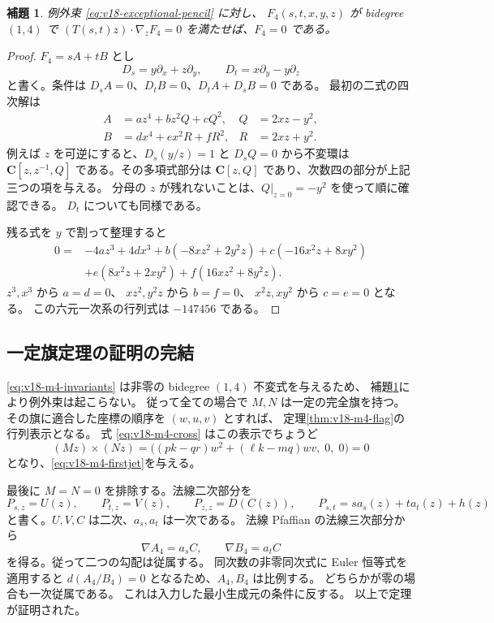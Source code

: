 \documentclass[11pt,a4paper]{ltjsarticle}
\newtheorem{lemma}[theorem]{補題}
\theoremstyle{remark}\newtheorem{remark}[theorem]{注意}
\begin{document}
\begin{lemma}\label{lem:v18-no-bidegree14}
例外束 \eqref{eq:v18-exceptional-pencil} に対し、
$F_4(s,t,x,y,z)$ が bidegree $(1,4)$ で
$(T(s,t)z)\cdot\nabla_zF_4=0$ を満たせば、$F_4=0$ である。
\end{lemma}
\begin{proof}
$F_4=sA+tB$ とし
\[
 D_s=y\partial_x+z\partial_y,\qquad
 D_t=x\partial_y-y\partial_z
\]
と書く。条件は $D_sA=0$、$D_tB=0$、$D_tA+D_sB=0$ である。
最初の二式の四次解は
\begin{align*}
 A&=a z^4+b z^2Q+cQ^2,& Q&=2xz-y^2,\\
 B&=d x^4+e x^2R+fR^2,& R&=2xz+y^2.
\end{align*}
例えば $z$ を可逆にすると、$D_s(y/z)=1$ と $D_sQ=0$ から不変環は
$\mathbf C[z,z^{-1},Q]$ である。その多項式部分は
$\mathbf C[z,Q]$ であり、次数四の部分が上記三つの項を与える。
分母の $z$ が残れないことは、$Q|_{z=0}=-y^2$ を使って順に確認できる。
$D_t$ についても同様である。

残る式を $y$ で割って整理すると
\begin{align*}
0={}&-4a z^3+4d x^3
 +b(-8xz^2+2y^2z)+c(-16x^2z+8xy^2)\\
 &+e(8x^2z+2xy^2)+f(16xz^2+8y^2z).
\end{align*}
$z^3,x^3$ から $a=d=0$、
$xz^2,y^2z$ から $b=f=0$、
$x^2z,xy^2$ から $c=e=0$ となる。
この六元一次系の行列式は $-147456$ である。
\end{proof}

\subsection{一定旗定理の証明の完結}

\eqref{eq:v18-m4-invariants} は非零の bidegree $(1,4)$ 不変式を与えるため、
補題\ref{lem:v18-no-bidegree14}により例外束は起こらない。
従って全ての場合で $M,N$ は一定の完全旗を持つ。
その旗に適合した座標の順序を $(w,u,v)$ とすれば、
定理\ref{thm:v18-m4-flag}の行列表示となる。
式 \eqref{eq:v18-m4-cross} はこの表示でちょうど
\[
 (Mz)\times(Nz)=
 \bigl((pk-qr)w^2+(\ell k-mq)wv,\;0,\;0\bigr)=0
\]
となり、\eqref{eq:v18-m4-firstjet}を与える。

最後に $M=N=0$ を排除する。法線二次部分を
\[
 P_{s,z}=U(z),\qquad P_{t,z}=V(z),\qquad
 P_{z,z}=D(C(z)),\qquad
 P_{s,t}=s a_s(z)+t a_t(z)+h(z)
\]
と書く。$U,V,C$ は二次、$a_s,a_t$ は一次である。
法線 Pfaffian の法線三次部分から
\[
                  \nabla A_4=a_s C,\qquad
                  \nabla B_4=a_t C
\]
を得る。従って二つの勾配は従属する。
同次数の非零同次式に Euler 恒等式を適用すると
$d(A_4/B_4)=0$ となるため、$A_4,B_4$ は比例する。
どちらかが零の場合も一次従属である。
これは入力した最小生成元の条件に反する。
以上で定理が証明された。
\end{document}
